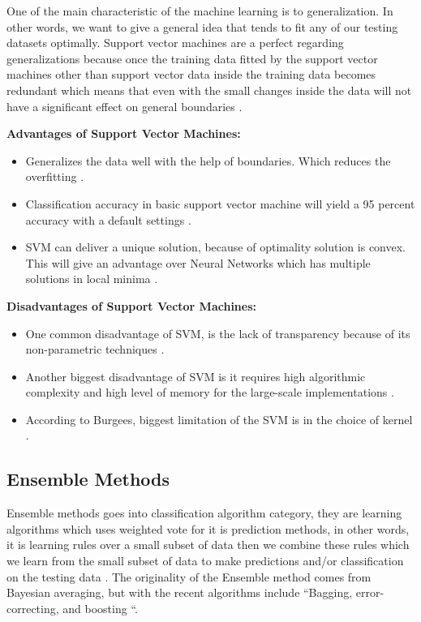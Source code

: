 \documentclass[sigconf]{acmart}
\begin{document}
\par One of the main characteristic of the machine learning is to generalization. In other words, we want to give a general idea that tends to fit any of our testing datasets optimally. Support vector machines are a perfect regarding generalizations because once the training data fitted by the support vector machines other than support vector data inside the training data becomes redundant which means that even with the small changes inside the data will not have a significant effect on general boundaries \cite{www-simafore-svm}. 

\textbf{Advantages of Support Vector Machines:}
\begin{itemize}
\item Generalizes the data well with the help of boundaries. Which reduces the overfitting \cite{www-simafore-svm}.
\item Classification accuracy in basic support vector machine will yield a 95 percent accuracy with a default settings \cite{www-simafore-svm}. 
\item SVM can deliver a unique solution, because of optimality solution is convex. This will give an advantage over Neural Networks which has multiple solutions in local minima \cite{berlin-svm}.
\end{itemize}

\textbf{Disadvantages of Support Vector Machines:}

\begin{itemize}
\item One common disadvantage of SVM, is the lack of transparency because of its non-parametric techniques \cite{berlin-svm}.
\item Another biggest disadvantage of SVM is it requires high algorithmic complexity and high level of memory for the large-scale implementations \cite{verma-ssv}. 
\item According to Burgees, biggest limitation of the SVM is in the choice of kernel \cite{Burges1998}.
\end{itemize}

\subsection{Ensemble Methods}
Ensemble methods goes into classification algorithm category, they are learning algorithms which uses weighted vote for it is prediction methods, in other words, it is learning rules over a small subset of data then we combine these rules which we learn from the small subset of data to make predictions and/or classification on the testing data \cite{dietterich-ensemble}. The originality of the Ensemble method comes from Bayesian averaging, but with the recent algorithms include ``Bagging, error-correcting, and boosting \cite{dietterich-ensemble}``. 
\end{document}
